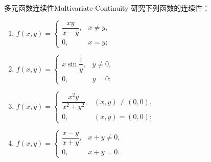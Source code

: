 \begin{problem}{多元函数连续性}{Multivariate-Continuity}
    研究下列函数的连续性：
    \begin{enumerate}
        \item $f(x, y) = \begin{cases} \dfrac{xy}{x-y}, & x \neq y, \\ 0, & x = y; \end{cases}$
        \item $f(x, y) = \begin{cases} x \sin \dfrac{1}{y}, & y \neq 0, \\ 0, & y = 0; \end{cases}$
        \item $f(x, y) = \begin{cases} \dfrac{x^2y}{x^2+y^2}, & (x, y) \neq (0, 0), \\ 0, & (x, y) = (0, 0); \end{cases}$
        \item $f(x, y) = \begin{cases} \dfrac{x-y}{x+y}, & x + y \neq 0, \\ 0, & x + y = 0. \end{cases}$
    \end{enumerate}
\end{problem}


